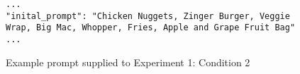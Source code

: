 \begin{figure}
    \centering
\begin{lstlisting}
...
"inital_prompt": "Chicken Nuggets, Zinger Burger, Veggie Wrap, Big Mac, Whopper, Fries, Apple and Grape Fruit Bag"
...
\end{lstlisting}
    \caption{Example prompt supplied to Experiment 1: Condition 2}
    \label{fig: Example Menu Prompting}
\end{figure}
